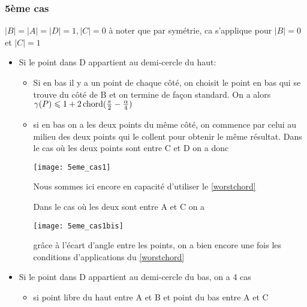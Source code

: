 \subsubsection*{5ème cas}\label{5cas} $|B| = |A| = |D| = 1, |C| = 0$
à noter que par symétrie, ca s'applique pour $|B| = 0$ et $|C| = 1$

\begin{itemize}

\item \label{5cas1} Si le point dans D appartient au demi-cercle du haut:

\begin{itemize}

\item \label{5cas11} Si en bas il y a un point de chaque côté, on choisit le point en bas qui se trouve du côté de B et on termine de façon standard. On a alors $\gamma(P) \leqslant 1 + 2\operatorname{chord}(\frac{\pi}{2} - \frac{\alpha}{4})$

\item \label{5cas12} si en bas on a les deux points du même côté, on commence par celui au milieu des deux points qui le collent pour obtenir le même résultat.
Dans le cas où les deux points sont entre C et D on a donc

  \texttt{[image: 5eme\_cas1]}

Nous sommes ici encore en capacité d'utiliser le \cref{worstchord}

\label{5cas13} Dans le cas où les deux sont entre A et C on a

  \texttt{[image: 5eme\_cas1bis]}

grâce à l'écart d'angle entre les points, on a bien encore une fois les
conditions d'applications du \cref{worstchord}

\end{itemize}

\item \label{5cas2} Si le point dans D appartient au demi-cercle du bas, on a 4 cas

\begin{itemize}

\item \label{5cas21} si point libre du haut entre A et B et point du bas entre A et C


\end{itemize}
\end{itemize}
